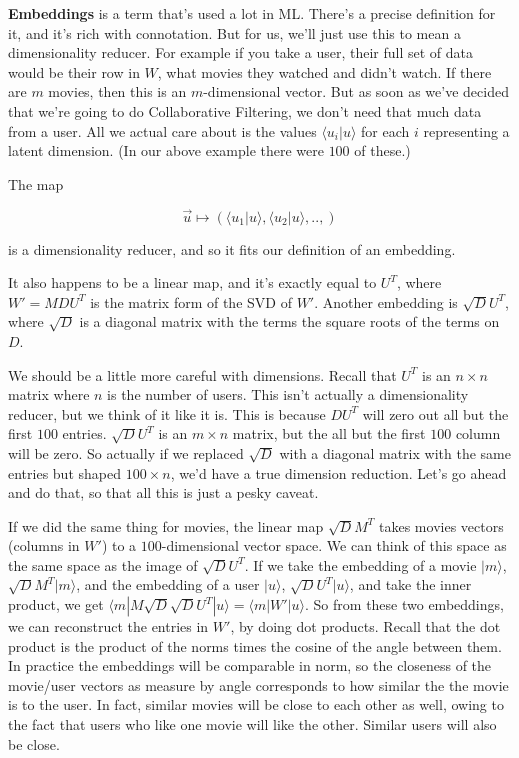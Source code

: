 \documentclass{amsbook}
\begin{document}
{\bf Embeddings} is a term that's used a lot in ML.  There's a precise definition for it, and it's rich with connotation.  But for us, we'll just use this to mean a dimensionality reducer.  For example if you take a user, their full set of data would be their row in $W$, what movies they watched and didn't watch.  If there are $m$ movies, then this is an $m$-dimensional vector.  But as soon as we've decided that we're going to do Collaborative Filtering, we don't need that much data from a user.  All we actual care about is the values $\langle u_i|u\rangle$ for each $i$ representing a latent dimension.  (In our above example there were $100$ of these.)

The map

$$
\vec u\mapsto\left(\langle u_1|u\rangle, \langle u_2|u\rangle, ..,\right)
$$

\noindent is a dimensionality reducer, and so it fits our definition of an embedding.

It also happens to be a linear map, and it's exactly equal to $U^T$, where $W'=MDU^T$ is the matrix form of the SVD of $W'$.  Another embedding is $\sqrt{D}U^T$, where $\sqrt{D}$ is a diagonal matrix with the terms the square roots of the terms on $D$.

We should be a little more careful with dimensions.  Recall that $U^T$ is an $n\times n$ matrix where $n$ is the number of users.  This isn't actually a dimensionality reducer, but we think of it like it is.  This is because $DU^T$ will zero out all but the first $100$ entries.  $\sqrt DU^T$ is an $m\times n$ matrix, but the all but the first $100$ column will be zero.  So actually if we replaced $\sqrt D$ with a diagonal matrix with the same entries but shaped $100\times n$, we'd have a true dimension reduction.  Let's go ahead and do that, so that all this is just a pesky caveat.

If we did the same thing for movies, the linear map $\sqrt DM^T$ takes movies vectors (columns in $W'$) to a $100$-dimensional vector space.  We can think of this space as the same space as the image of $\sqrt DU^T$.  If we take the embedding of a movie $|m\rangle$, $\sqrt DM^T|m\rangle$, and the embedding of a user $|u\rangle$, $\sqrt DU^T|u\rangle$, and take the inner product, we get $\langle m|M\sqrt D\sqrt DU^T|u\rangle=\langle m|W'|u\rangle$.  So from these two embeddings, we can reconstruct the entries in $W'$, by doing dot products.  Recall that the dot product is the product of the norms times the cosine of the angle between them.  In practice the embeddings will be comparable in norm, so the closeness of the movie/user vectors as measure by angle corresponds to how similar the the movie is to the user.  In fact, similar movies will be close to each other as well, owing to the fact that users who like one movie will like the other.  Similar users will also be close.
\end{document}
